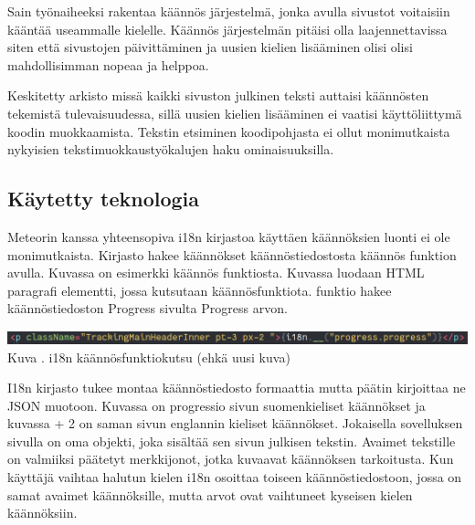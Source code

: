 \documentclass[11pt,a4paper,titlepage,oneside]{article}
\begin{document}
Sain työnaiheeksi rakentaa käännös järjestelmä, jonka avulla sivustot voitaisiin kääntää useammalle kielelle.
Käännös järjestelmän pitäisi olla laajennettavissa siten että sivustojen päivittäminen ja uusien kielien lisääminen olisi 
olisi mahdollisimman nopeaa ja helppoa.\\
\medskip

Keskitetty arkisto missä kaikki sivuston julkinen teksti auttaisi käännösten tekemistä tulevaisuudessa,
sillä uusien kielien lisääminen ei vaatisi käyttöliittymä koodin muokkaamista.
Tekstin etsiminen koodipohjasta ei ollut monimutkaista nykyisien tekstimuokkaustyökalujen haku ominaisuuksilla.







\subsection{Käytetty teknologia}





Meteorin kanssa yhteensopiva i18n kirjastoa käyttäen käännöksien luonti ei ole monimutkaista.
Kirjasto hakee käännökset käännöstiedostosta käännös funktion avulla.
Kuvassa \nextImageCount{} on esimerkki käännös funktiosta.
Kuvassa luodaan HTML paragrafi elementti, jossa kutsutaan käännösfunktiota. 
funktio hakee käännöstiedoston Progress sivulta Progress arvon.\\
\medskip

\bigskip
\includegraphics[width = 15cm]{src/public/oppar/translationcall.png}\\
Kuva \getImgCount. {} i18n käännösfunktiokutsu (ehkä uusi kuva)
\medskip



I18n kirjasto tukee montaa käännöstiedosto formaattia mutta päätin kirjoittaa ne JSON muotoon. %
Kuvassa \nextImageCount{} on progressio sivun suomenkieliset käännökset ja kuvassa {\the\numexpr \theimgCounter + 2 } on saman sivun englannin kieliset käännökset.
Jokaisella sovelluksen sivulla on oma objekti, joka sisältää sen sivun julkisen tekstin. 
Avaimet tekstille on valmiiksi päätetyt merkkijonot, jotka kuvaavat käännöksen tarkoitusta.
Kun käyttäjä vaihtaa halutun kielen i18n osoittaa toiseen käännöstiedostoon, 
jossa on samat avaimet käännöksille, mutta arvot ovat vaihtuneet kyseisen kielen käännöksiin.
\medskip
\end{document}
